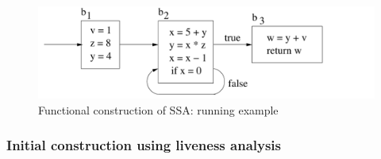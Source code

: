 
\begin{figure}
\begin{center}
\includegraphics[scale=0.5]{SSAConstructionExample1}
\end{center}
\caption{\label{fig:FunctionalCorrespondenceRunningExampleGraphic} Functional construction of SSA: running example}
\end{figure}

\subsubsection{Initial construction using liveness analysis}

